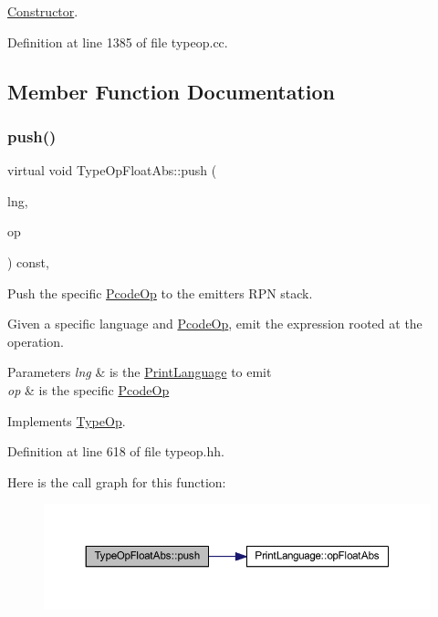 \mbox{\hyperlink{class_constructor}{Constructor}}. 



Definition at line 1385 of file typeop.\+cc.



\subsection{Member Function Documentation}
\mbox{\label{class_type_op_float_abs_aea9d2558117c0cbe21acb48625fe03b2}} 
\subsubsection{\texorpdfstring{push()}{push()}}
{\footnotesize\ttfamily virtual void Type\+Op\+Float\+Abs\+::push (\begin{DoxyParamCaption}\item[{\mbox{\hyperlink{class_print_language}{Print\+Language}} $\ast$}]{lng,  }\item[{const \mbox{\hyperlink{class_pcode_op}{Pcode\+Op}} $\ast$}]{op }\end{DoxyParamCaption}) const\hspace{0.3cm}{\ttfamily [inline]}, {\ttfamily [virtual]}}



Push the specific \mbox{\hyperlink{class_pcode_op}{Pcode\+Op}} to the emitter\textquotesingle{}s R\+PN stack. 

Given a specific language and \mbox{\hyperlink{class_pcode_op}{Pcode\+Op}}, emit the expression rooted at the operation. 
\begin{DoxyParams}{Parameters}
{\em lng} & is the \mbox{\hyperlink{class_print_language}{Print\+Language}} to emit \\
\hline
{\em op} & is the specific \mbox{\hyperlink{class_pcode_op}{Pcode\+Op}} \\
\hline
\end{DoxyParams}


Implements \mbox{\hyperlink{class_type_op_ac9c9544203ed74dabe6ac662b653b2af}{Type\+Op}}.



Definition at line 618 of file typeop.\+hh.

Here is the call graph for this function\+:
\nopagebreak
\begin{figure}[H]
\begin{center}
\leavevmode
\includegraphics[width=350pt]{class_type_op_float_abs_aea9d2558117c0cbe21acb48625fe03b2_cgraph}
\end{center}
\end{figure}


